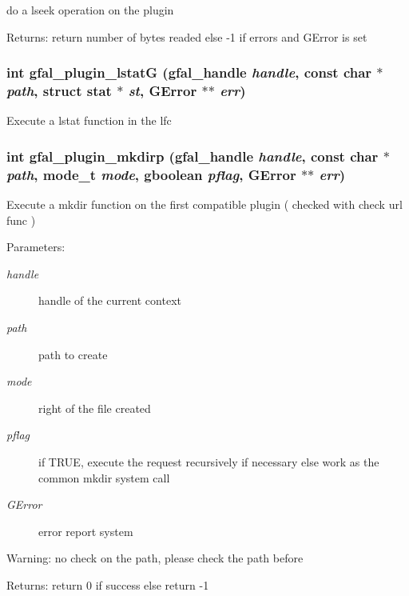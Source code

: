 do a lseek operation on the plugin \begin{Desc}
\item[Returns:]return number of bytes readed else -1 if errors and GError is set \end{Desc}
\subsubsection{\setlength{\rightskip}{0pt plus 5cm}int gfal\_\-plugin\_\-lstat\-G (gfal\_\-handle {\em handle}, const char $\ast$ {\em path}, struct stat $\ast$ {\em st}, GError $\ast$$\ast$ {\em err})}\label{gfal__common__plugin_8c_81a0d301234958fc59518fb6ce306425}


Execute a lstat function in the lfc 
\subsubsection{\setlength{\rightskip}{0pt plus 5cm}int gfal\_\-plugin\_\-mkdirp (gfal\_\-handle {\em handle}, const char $\ast$ {\em path}, mode\_\-t {\em mode}, gboolean {\em pflag}, GError $\ast$$\ast$ {\em err})}\label{gfal__common__plugin_8c_815a97902a1067b99f9bcc2f63b19e11}


Execute a mkdir function on the first compatible plugin ( checked with check url func ) \begin{Desc}
\item[Parameters:]
\begin{description}
\item[{\em handle}]handle of the current context \item[{\em path}]path to create \item[{\em mode}]right of the file created \item[{\em pflag}]if TRUE, execute the request recursively if necessary else work as the common mkdir system call \item[{\em GError}]error report system \end{description}
\end{Desc}
\begin{Desc}
\item[Warning:]no check on the path, please check the path before \end{Desc}
\begin{Desc}
\item[Returns:]return 0 if success else return -1 \end{Desc}
